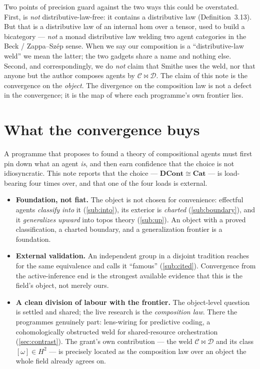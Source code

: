 \documentclass[11pt]{amsart}
\theoremstyle{plain}
\theoremstyle{definition}
\newcommand{\C}{\mathcal{C}}
\newcommand{\D}{\mathcal{D}}
\newcommand{\Cat}{\mathbf{Cat}}
\newcommand{\DCont}{\mathbf{DCont}}
\newcommand{\iso}{\cong}
\begin{document}
Two points of precision guard against the two ways this could be overstated. First,
\cite{SmitheCAI2} is \emph{not} distributive-law-free: it contains a distributive law
(Definition~3.13). But that is a distributive law of an internal hom over a tensor, used to build
a bicategory --- \emph{not} a monad distributive law welding two agent categories in the
Beck / Zappa--Sz\'ep sense. When we say our composition is a ``distributive-law weld'' we mean the
latter; the two gadgets share a name and nothing else. Second, and correspondingly, we do
\emph{not} claim that Smithe uses the weld, nor that anyone but the author composes agents by
$\C\bowtie\D$. The claim of this note is the convergence on the \emph{object}. The divergence on
the composition law is not a defect in the convergence; it is the map of where each programme's
own frontier lies.

\section{What the convergence buys}\label{sec:grant}

A programme that proposes to found a theory of compositional agents must first pin down what an
agent \emph{is}, and then earn confidence that the choice is not idiosyncratic. This note reports
that the choice --- $\DCont\iso\Cat$ --- is load-bearing four times over, and that one of the four
loads is external.

\begin{itemize}
\item \textbf{Foundation, not fiat.} The object is not chosen for convenience: effectful agents
\emph{classify into} it (\ref{sub:into}), its exterior is \emph{charted} (\ref{sub:boundary}), and
it \emph{generalizes upward} into topos theory (\ref{sub:up}). An object with a proved
classification, a charted boundary, and a generalization frontier is a foundation.
\item \textbf{External validation.} An independent group in a disjoint tradition reaches for the
same equivalence and calls it ``famous'' (\ref{sub:cited}). Convergence from the active-inference
end is the strongest available evidence that this is the field's object, not merely ours.
\item \textbf{A clean division of labour with the frontier.} The object-level question is settled
and shared; the live research is the \emph{composition law}. There the programmes genuinely part:
lens-wiring for predictive coding, a cohomologically obstructed weld for shared-resource
orchestration (\ref{sec:contrast}). The grant's own contribution --- the weld $\C\bowtie\D$ and
its class $[\omega]\in H^2$ --- is precisely located as the composition law over an object the
whole field already agrees on.
\end{itemize}
\end{document}
